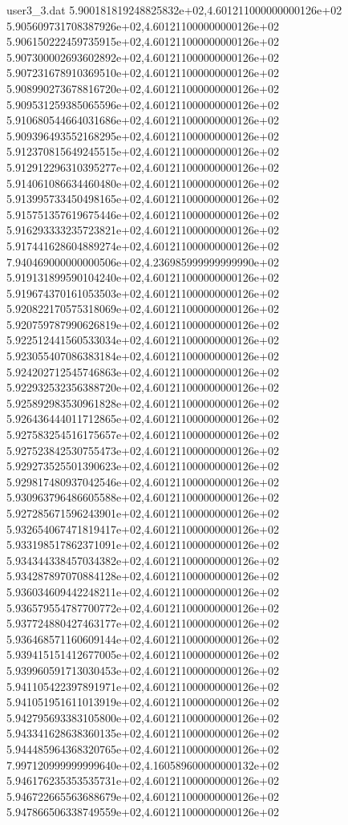 \begin{filecontents}{user3_3.dat}
5.900181819248825832e+02,4.601211000000000126e+02
5.905609731708387926e+02,4.601211000000000126e+02
5.906150222459735915e+02,4.601211000000000126e+02
5.907300002693602892e+02,4.601211000000000126e+02
5.907231678910369510e+02,4.601211000000000126e+02
5.908990273678816720e+02,4.601211000000000126e+02
5.909531259385065596e+02,4.601211000000000126e+02
5.910680544664031686e+02,4.601211000000000126e+02
5.909396493552168295e+02,4.601211000000000126e+02
5.912370815649245515e+02,4.601211000000000126e+02
5.912912296310395277e+02,4.601211000000000126e+02
5.914061086634460480e+02,4.601211000000000126e+02
5.913995733450498165e+02,4.601211000000000126e+02
5.915751357619675446e+02,4.601211000000000126e+02
5.916293333235723821e+02,4.601211000000000126e+02
5.917441628604889274e+02,4.601211000000000126e+02
7.940469000000000506e+02,4.236985999999999990e+02
5.919131899590104240e+02,4.601211000000000126e+02
5.919674370161053503e+02,4.601211000000000126e+02
5.920822170575318069e+02,4.601211000000000126e+02
5.920759787990626819e+02,4.601211000000000126e+02
5.922512441560533034e+02,4.601211000000000126e+02
5.923055407086383184e+02,4.601211000000000126e+02
5.924202712545746863e+02,4.601211000000000126e+02
5.922932532356388720e+02,4.601211000000000126e+02
5.925892983530961828e+02,4.601211000000000126e+02
5.926436444011712865e+02,4.601211000000000126e+02
5.927583254516175657e+02,4.601211000000000126e+02
5.927523842530755473e+02,4.601211000000000126e+02
5.929273525501390623e+02,4.601211000000000126e+02
5.929817480937042546e+02,4.601211000000000126e+02
5.930963796486605588e+02,4.601211000000000126e+02
5.927285671596243901e+02,4.601211000000000126e+02
5.932654067471819417e+02,4.601211000000000126e+02
5.933198517862371091e+02,4.601211000000000126e+02
5.934344338457034382e+02,4.601211000000000126e+02
5.934287897070884128e+02,4.601211000000000126e+02
5.936034609442248211e+02,4.601211000000000126e+02
5.936579554787700772e+02,4.601211000000000126e+02
5.937724880427463177e+02,4.601211000000000126e+02
5.936468571160609144e+02,4.601211000000000126e+02
5.939415151412677005e+02,4.601211000000000126e+02
5.939960591713030453e+02,4.601211000000000126e+02
5.941105422397891971e+02,4.601211000000000126e+02
5.941051951611013919e+02,4.601211000000000126e+02
5.942795693383105800e+02,4.601211000000000126e+02
5.943341628638360135e+02,4.601211000000000126e+02
5.944485964368320765e+02,4.601211000000000126e+02
7.997120999999999640e+02,4.160589600000000132e+02
5.946176235353535731e+02,4.601211000000000126e+02
5.946722665563688679e+02,4.601211000000000126e+02
5.947866506338749559e+02,4.601211000000000126e+02

\end{filecontents}
